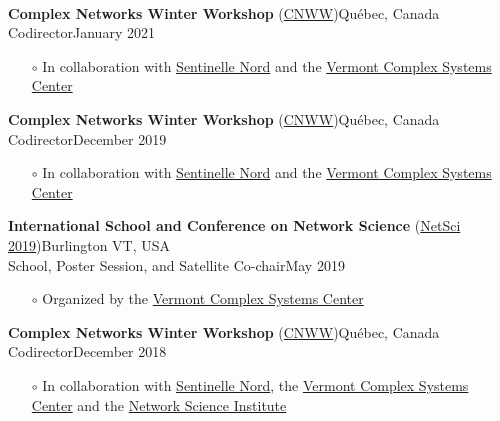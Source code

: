 \documentclass[11pt]{article}
\newcommand{\TitreSection}[1]{\colorbox{background}{\makebox[\textwidth-0.5em][c]{\Large\textrm{\textsc{#1}}}}\vspace{0.75\baselineskip}\\}
\begin{document}
%
%
%
%
%
\pagebreak
\TitreSection{Organizing Activities}
%
%
\parbox{\textwidth}{\textbf{Complex Networks Winter Workshop} (\href{https://sentinellenord.ulaval.ca/fr/reseauxcomplexes2020}{CNWW})\hfill Qu\'ebec, Canada\\
Codirector\hfill January 2021
\begin{itemize}[leftmargin=1.5em]\small
  \item[$\circ$] In collaboration with \href{http://sentinellenord.ulaval.ca/}{Sentinelle Nord} and the \href{http://www.vermontcomplexsystems.org/}{Vermont Complex Systems Center}
\end{itemize}}
%
\parbox{\textwidth}{\textbf{Complex Networks Winter Workshop} (\href{https://sentinellenord.ulaval.ca/fr/reseauxcomplexes2019}{CNWW})\hfill Qu\'ebec, Canada\\
Codirector\hfill December 2019
\begin{itemize}[leftmargin=1.5em]\small
  \item[$\circ$] In collaboration with \href{http://sentinellenord.ulaval.ca/}{Sentinelle Nord} and the \href{http://www.vermontcomplexsystems.org/}{Vermont Complex Systems Center}
\end{itemize}}
%
\parbox{\textwidth}{\textbf{International School and Conference on Network Science} (\href{http://vermontcomplexsystems.org/events/netsci/}{NetSci 2019})\hfill Burlington VT, USA\\
School, Poster Session, and Satellite Co-chair\hfill May 2019
\begin{itemize}[leftmargin=1.5em]\small
  \item[$\circ$] Organized by the \href{http://www.vermontcomplexsystems.org/}{Vermont Complex Systems Center}
\end{itemize}}
%
\parbox{\textwidth}{\textbf{Complex Networks Winter Workshop} (\href{https://sentinellenord.ulaval.ca/fr/reseauxcomplexes2018}{CNWW})\hfill Qu\'ebec, Canada\\
Codirector\hfill December 2018
\begin{itemize}[leftmargin=1.5em]\small
  \item[$\circ$] In collaboration with \href{http://sentinellenord.ulaval.ca/}{Sentinelle Nord}, the \href{http://www.vermontcomplexsystems.org/}{Vermont Complex Systems Center} and the \href{https://www.networkscienceinstitute.org/}{Network Science Institute}
\end{itemize}}
\end{document}
